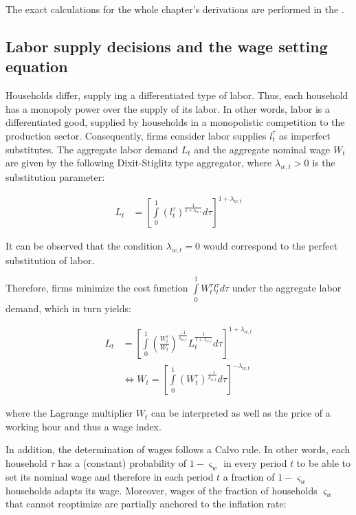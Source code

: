 \documentclass{pracamgr}
\numberwithin{equation}{section}
\begin{document}
The exact calculations for the whole chapter's derivations are performed in the .

\subsection{Labor supply decisions and the wage setting equation} \label{Labor Supply decisions and the wage setting equation}

Households differ, supply ing a differentiated type of labor. Thus, each household has a monopoly power over the supply of its labor. In other words, labor is a differentiated good, supplied by households in a monopolistic competition to the production sector. Consequently, firms consider labor supplies $l_{t}^{\tau}$ as imperfect substitutes. The aggregate labor demand $L_{t}$ and the aggregate nominal wage $W_{t}$ are given by the following Dixit-Stiglitz type aggregator, where $\lambda_{w ,t} > 0$ is the substitution parameter:

\begin{align}
L_{t} &= \left[ \int\limits_{0}^{1} \left( l_{t}^{\tau} \right)^{\frac{1}{1+\lambda_{w,t}}} d\tau \right]^{1+\lambda_{w,t}}
\end{align}

It can be observed that the condition $\lambda_{w ,t} = 0$ would correspond to the perfect substitution of labor.

Therefore, firms minimize the cost function $\int\limits_{0}^{1} W_{t}^{\tau} l_{t}^{\tau} d\tau$ under the aggregate labor demand, which in turn yields:

\begin{align} \label{Aggregate labor demand}
L_{t} &= \left[ \int\limits_{0}^{1} \left( \frac{W_{t}^{\tau}}{W_{t}}\right)^{\frac{-1}{\lambda_{w ,t}}} L_{t}^{\frac{1}{1+\lambda_{w ,t}}} d\tau \right]^{1+\lambda_{w,t}} \nonumber \\
& \iff W_{t} = \left[ \int\limits_{0}^{1} \left( W_{t}^{\tau} \right)^{\frac{-1}{\lambda_{w ,t}}}  d\tau \right]^{-\lambda_{w,t}}
\end{align}

where the Lagrange multiplier $W_{t}$ can be interpreted as well as the price of a working hour and thus a wage index.

In addition, the determination of wages follows a Calvo rule. In other words, each household $\tau$ has a (constant) probability of $1-\varsigma_{w}$ in every period $t$ to be able to set its nominal wage and therefore in each period $t$ a fraction of $1-\varsigma_{w}$ households adapts its wage. Moreover, wages of the fraction of households $\varsigma_{w}$ that cannot reoptimize are partially anchored to the inflation rate:
\end{document}
